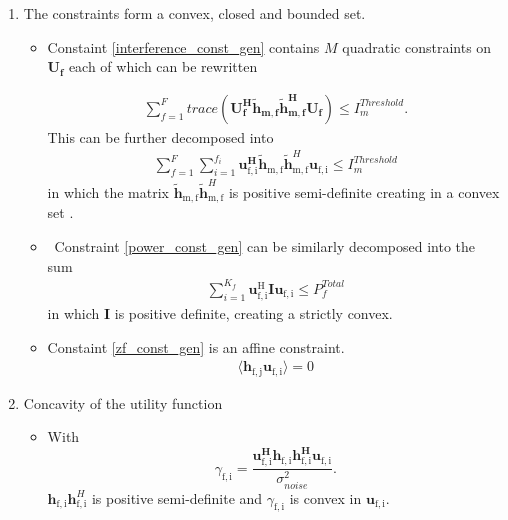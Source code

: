 \documentclass[12pt,a4paper]{report}
\begin{document}
\begin{enumerate}


\item
The constraints form a convex, closed and bounded set. 

\begin{itemize}

\item
	Constaint \eqref{interference_const_gen} contains $M$ quadratic constraints on $\mathbf{U_f}$ each of which 
	can be rewritten  

\begin{gather*}
	\sum_{f=1}^F
	trace(\mathbf{U_f^H} \mathbf{\tilde{h}_{m,f}} \mathbf{\tilde{h}_{m,f}^H} \mathbf{U_f} )\leq 
	I^{Threshold}_{m}.
\end{gather*}
This can be further decomposed into  
	\begin{gather*}
	\sum_{f=1}^F
	\sum_{i=1}^{f_i}
	\mathbf{u_{\mathrm{f,i}}^H}\mathbf{\tilde{h}_{\mathrm{m,f}}} \mathbf{\tilde{h}}_{\mathrm{m,f}}^H
	\mathbf{u_{\mathrm{f,i}}} \leq I^{Threshold}_{m}
	\end{gather*}
in which the matrix $ \mathbf{\tilde{h}_{\mathrm{m,f}}} \mathbf{\tilde{h}}_{\mathrm{m,f}}^H$ is  positive semi-definite creating in a convex set 
\cite[p.8,9]{BoV:04}. 


\item \
	Constraint \eqref{power_const_gen} can be similarly decomposed into the sum
	\begin{gather*}
		\sum_{i=1}^{K_f}\mathbf{u_{\mathrm{f,i}}^{\mathrm{H}}} \mathbf{I} 		
		\mathbf{u_{\mathrm{f,i}}} \leq  P^{Total}_{f}
	\end{gather*}
	in which $\mathbf{I}$ is positive definite, creating a strictly convex.

\item 
	Constaint \eqref{zf_const_gen} is an affine constraint. 
		\begin{gather*}
		\langle \mathbf{h_{\mathrm{f,j}}}\mathbf{u_{\mathrm{f,i}}} \rangle =0
		\end{gather*}
\end{itemize}


\item Concavity of the utility function
\begin{itemize}
\item 
With
	\begin{equation}\label{zf_snr}
	\gamma_{\mathrm{f,i}} = 
	\frac{\mathbf{u^H_{\mathrm{f,i}}h_{\mathrm{f,i}}h^H_{\mathrm{f,i}}u_{\mathrm{f,i}}}}
	{\sigma^2_{noise}  
	}.
	\end{equation}
	 $\mathbf{h}_{\mathrm{f,i}}\mathbf{h}^H_{\mathrm{f,i}}$ is positive semi-definite and $\gamma_{\mathrm{f,i}}$ is convex in ${\mathbf{u}_{\mathrm{f,i}}}$. 


\end{itemize}
\end{enumerate}
\end{document}
